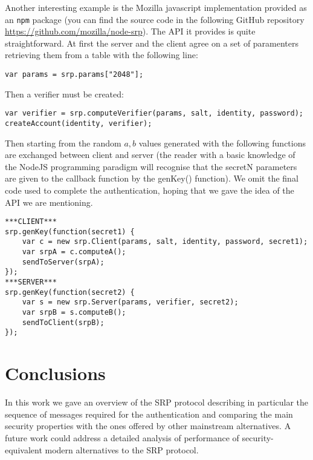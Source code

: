 \documentclass[11pt]{article}
\begin{document}
Another interesting example is the Mozilla javascript implementation provided as an \texttt{npm} package (you can find the source code in the following GitHub repository \url{https://github.com/mozilla/node-srp}). The API it provides is quite straightforward. At first the server and the client agree on a set of paramenters retrieving them from a table with the following line:
\begin{verbatim}
var params = srp.params["2048"];
\end{verbatim} 
Then a verifier must be created:
\begin{verbatim}
var verifier = srp.computeVerifier(params, salt, identity, password);
createAccount(identity, verifier);
\end{verbatim}
Then starting from the random $a, b$ values generated with the following functions are exchanged between client and server (the reader with a basic knowledge of the NodeJS programming paradigm will recognise that the secretN parameters are given to the callback function by the genKey() function). We omit the final code used to complete the authentication, hoping that we gave the idea of the API we are mentioning.
\begin{verbatim}
***CLIENT***
srp.genKey(function(secret1) {
    var c = new srp.Client(params, salt, identity, password, secret1);
    var srpA = c.computeA();
    sendToServer(srpA);
});
***SERVER***
srp.genKey(function(secret2) {
    var s = new srp.Server(params, verifier, secret2);
    var srpB = s.computeB();
    sendToClient(srpB);
});
\end{verbatim}

\section{Conclusions}
In this work we gave an overview of the SRP protocol describing in particular the sequence of messages required for the authentication and comparing the main security properties with the ones offered by other mainstream alternatives. A future work could address a detailed analysis of performance of security-equivalent modern alternatives to the SRP protocol. 

\nocite{*} %
 

\end{document}
